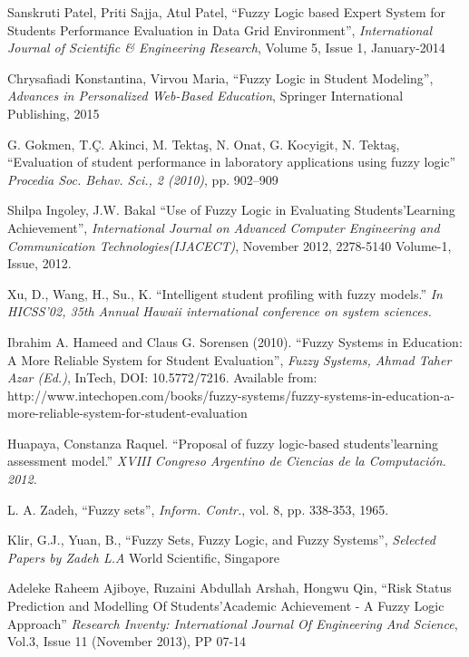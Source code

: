 \documentclass[conference]{IEEEtran}
\newcommand{\quotes}[1]{``#1''}
\begin{document}
\begin{thebibliography}{11}


Sanskruti Patel, Priti Sajja, Atul Patel, \quotes{Fuzzy Logic based Expert System for Students Performance Evaluation in Data Grid Environment}, \emph{International Journal of Scientific \& Engineering Research}, Volume 5, Issue 1, January-2014

Chrysafiadi Konstantina, Virvou Maria, \quotes{Fuzzy Logic in Student Modeling}, \emph{Advances in Personalized Web-Based Education}, Springer International Publishing, 2015


G. Gokmen, T.Ç. Akinci, M. Tektaş, N. Onat, G. Kocyigit, N. Tektaş, \quotes{Evaluation of student performance in laboratory applications using fuzzy logic} \emph{Procedia Soc. Behav. Sci., 2 (2010)}, pp. 902–909

Shilpa Ingoley, J.W. Bakal \quotes{Use of Fuzzy Logic in Evaluating Students\rq Learning Achievement}, \emph{International Journal on Advanced Computer Engineering and Communication Technologies(IJACECT)}, November 2012, 2278-5140 Volume-1, Issue, 2012.


Xu, D., Wang, H., Su., K. \quotes{Intelligent student profiling with fuzzy models.} \emph{In HICSS’02, 35th Annual Hawaii international conference on system sciences.}

Ibrahim A. Hameed and Claus G. Sorensen (2010). \quotes{Fuzzy Systems in Education: A More Reliable System for Student Evaluation}, \emph{Fuzzy Systems, Ahmad Taher Azar (Ed.)}, InTech, DOI: 10.5772/7216. Available from: http://www.intechopen.com/books/fuzzy-systems/fuzzy-systems-in-education-a-more-reliable-system-for-student-evaluation

Huapaya, Constanza Raquel. \quotes{Proposal of fuzzy logic-based students\rq learning assessment model.} \emph{XVIII Congreso Argentino de Ciencias de la Computación. 2012.}


L. A. Zadeh, \quotes{Fuzzy sets}, \emph{Inform. Contr.}, vol. 8, pp. 338-353, 1965.

Klir, G.J., Yuan, B., \quotes{Fuzzy Sets, Fuzzy Logic, and Fuzzy Systems}, \emph{Selected Papers by Zadeh L.A} World Scientific, Singapore 

Adeleke Raheem Ajiboye, Ruzaini Abdullah Arshah, Hongwu Qin, \quotes{Risk Status Prediction and Modelling Of Students\rq Academic Achievement - A Fuzzy Logic Approach} \emph{Research Inventy: International Journal Of Engineering And Science}, Vol.3, Issue 11 (November 2013), PP 07-14



\end{thebibliography}
\end{document}
